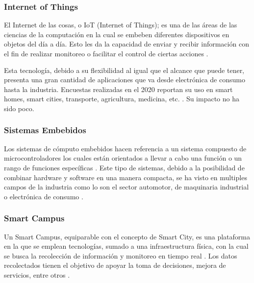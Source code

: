 \subsubsection{Internet of Things}


El Internet de las cosas, o IoT (Internet of Things); es una de las áreas de las ciencias de la computación en la cual  se embeben diferentes dispositivos en objetos del día a día. Esto les da la capacidad de enviar y recibir información con el fin de realizar monitoreo o facilitar el control de ciertas acciones \cite{Berte_2018}.

Esta tecnología, debido a su flexibilidad al igual que el alcance que puede tener, presenta una gran cantidad de aplicaciones que va desde electrónica de consumo hasta la industria. Encuestas realizadas en el 2020 reportan su uso en smart homes, smart cities, transporte, agricultura, medicina, etc. \cite{Dawood_2020}. Su impacto no ha sido poco.

\subsubsection*{Sistemas Embebidos}


Los sistemas de cómputo embebidos hacen referencia a un sistema compuesto de microcontroladores los cuales están orientados a llevar a cabo una función o un rango de funciones específicas \cite{heath2002embedded}. Este tipo de sistemas, debido a la posibilidad de combinar hardware y software en una manera compacta, se ha visto en multiples campos de la industria como lo son el sector automotor, de maquinaria industrial o electrónica de consumo \cite{deichmann_2022}.


\subsubsection*{Smart Campus}


Un Smart Campus, equiparable con el concepto de Smart City, es una plataforma en la que se emplean tecnologías, sumado a una infraestructura física, con la cual se busca la recolección de información y monitoreo en tiempo real \cite{MinAllah2020}. Los datos recolectados tienen el objetivo de apoyar la toma de decisiones, mejora de servicios, entre otros \cite{Anagnostopoulos_2023}.

